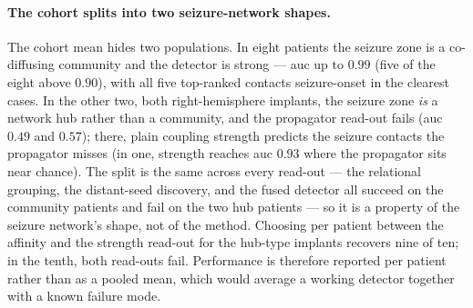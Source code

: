 \paragraph{The cohort splits into two seizure-network shapes.}
The cohort mean hides two populations. In eight patients the seizure zone is a co-diffusing community and the detector is strong --- \gls{auc} up to \(0.99\) (five of the eight above \(0.90\)), with all five top-ranked contacts seizure-onset in the clearest cases. In the other two, both right-hemisphere implants, the seizure zone \emph{is} a network hub rather than a community, and the propagator read-out fails (\gls{auc} \(0.49\) and \(0.57\)); there, plain coupling strength predicts the seizure contacts the propagator misses (in one, strength reaches \gls{auc} \(0.93\) where the propagator sits near chance). The split is the same across every read-out --- the relational grouping, the distant-seed discovery, and the fused detector all succeed on the community patients and fail on the two hub patients --- so it is a property of the seizure network's shape, not of the method. Choosing per patient between the affinity and the strength read-out for the hub-type implants recovers nine of ten; in the tenth, both read-outs fail. Performance is therefore reported per patient rather than as a pooled mean, which would average a working detector together with a known failure mode.
